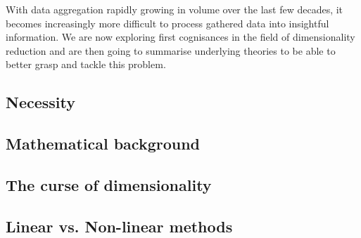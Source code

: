 \vspace{-2mm}
With data aggregation rapidly growing in volume over the last few decades, it becomes increasingly more difficult to process gathered data into insightful information.
We are now exploring first cognisances in the field of dimensionality reduction and are then going to summarise underlying theories to be able to better grasp and tackle this problem.
\vspace{-6mm}


\subsection{Necessity}
\vspace{-2mm}

\clearpage




\subsection{Mathematical background}

\clearpage


\subsection{The curse of dimensionality} \label{curseOfDimensionality}

\vfill
\clearpage


\subsection{Linear vs. Non-linear methods}

\clearpage
